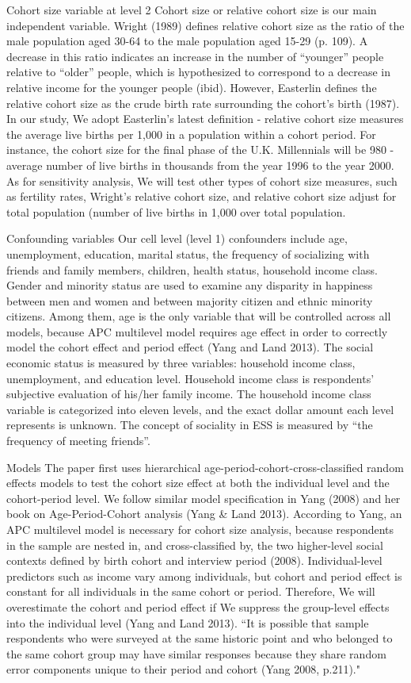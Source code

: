 Cohort size variable at level 2
Cohort size or relative cohort size is our main independent variable. Wright (1989) defines relative cohort size as the ratio of the male population aged 30-64 to the male population aged 15-29 (p. 109). A decrease in this ratio indicates an increase in the number of “younger” people relative to “older” people, which is hypothesized to correspond to a decrease in relative income for the younger people (ibid). However, Easterlin defines the relative cohort size as the crude birth rate surrounding the cohort’s birth (1987). In our study, We adopt Easterlin’s latest definition - relative cohort size measures the average live births per 1,000 in a population within a cohort period. For instance, the cohort size for the final phase of the U.K. Millennials will be 980 - average number of live births in thousands from the year 1996 to the year 2000. As for sensitivity analysis, We will test other types of cohort size measures, such as fertility rates, Wright’s relative cohort size, and relative cohort size adjust for total population (number of live births in 1,000 over total population.

Confounding variables
Our cell level (level 1) confounders include age, unemployment, education, marital status, the frequency of socializing with friends and family members, children, health status, household income class. Gender and minority status are used to examine any disparity in happiness between men and women and between majority citizen and ethnic minority citizens. Among them, age is the only variable that will be controlled across all models, because APC multilevel model requires age effect in order to correctly model the cohort effect and period effect (Yang and Land 2013). The social economic status is measured by three variables: household income class, unemployment, and education level. Household income class is respondents’ subjective evaluation of his/her family income. The household income class variable is categorized into eleven levels, and the exact dollar amount each level represents is unknown.  The concept of sociality in ESS is measured by “the frequency of meeting friends”. 

Models
The paper first uses hierarchical age-period-cohort-cross-classified random effects models to test the cohort size effect at both the individual level and the cohort-period level. We follow similar model specification in Yang (2008) and her book on Age-Period-Cohort analysis (Yang & Land 2013).  According to Yang, an APC multilevel model is necessary for cohort size analysis, because respondents in the sample are nested in, and cross-classified by, the two higher-level social contexts defined by birth cohort and interview period (2008). Individual-level predictors such as income vary among individuals, but cohort and period effect is constant for all individuals in the same cohort or period. Therefore, We will overestimate the cohort and period effect if We suppress the group-level effects into the individual level (Yang and Land 2013). “It is possible that sample respondents who were surveyed at the same historic point and who belonged to the same cohort group may have similar responses because they share random error components unique to their period and cohort (Yang 2008, p.211)." 

